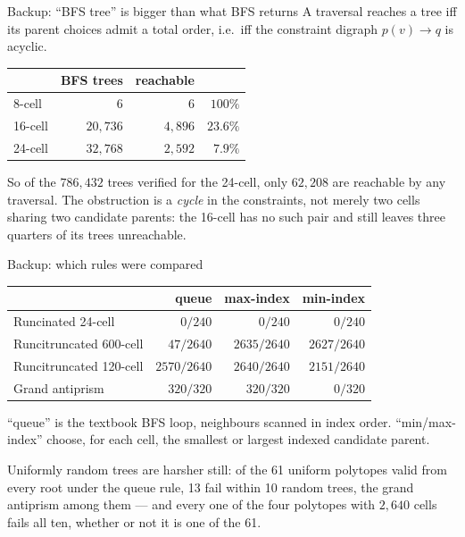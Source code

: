 \documentclass[aspectratio=43,11pt]{beamer}
\begin{document}
\begin{frame}{Backup: ``BFS tree'' is bigger than what BFS returns}
  A traversal reaches a tree iff its parent choices admit a total
  order, i.e.\ iff the constraint digraph $p(v)\to q$ is acyclic.
  \medskip

  \centering
  \begin{tabular}{lrrr}
    \toprule
    & BFS trees & reachable & \\
    \midrule
    8-cell  & $6$        & $6$      & $100\%$\\
    16-cell & $20{,}736$ & $4{,}896$  & $23.6\%$\\
    24-cell & $32{,}768$ & $2{,}592$  & $7.9\%$\\
    \bottomrule
  \end{tabular}

  \raggedright\medskip
  So of the $786{,}432$ trees verified for the 24-cell, only
  $62{,}208$ are reachable by any traversal.
  The obstruction is a \emph{cycle} in the constraints, not merely two
  cells sharing two candidate parents: the 16-cell has no such pair and
  still leaves three quarters of its trees unreachable.
\end{frame}

\begin{frame}{Backup: which rules were compared}
  \centering
  {\small
  \begin{tabular}{lrrr}
    \toprule
    & queue & max-index & min-index\\
    \midrule
    Runcinated 24-cell      & $0/240$     & $0/240$     & $0/240$\\
    Runcitruncated 600-cell & $47/2640$   & $2635/2640$ & $2627/2640$\\
    Runcitruncated 120-cell & $2570/2640$ & $2640/2640$ & $2151/2640$\\
    \midrule
    Grand antiprism         & $320/320$   & $320/320$   & \alert{$0/320$}\\
    \bottomrule
  \end{tabular}}

  \raggedright\medskip
  {\small
  ``queue'' is the textbook BFS loop, neighbours scanned in index
  order. ``min/max-index'' choose, for each cell, the smallest or
  largest indexed candidate parent.
  \smallskip

  Uniformly random trees are harsher still: of the 61 uniform
  polytopes valid from every root under the queue rule, 13 fail within
  10 random trees, the grand antiprism among them --- and every one of
  the four polytopes with $2{,}640$ cells fails all ten, whether or not
  it is one of the 61.}
\end{frame}
\end{document}
